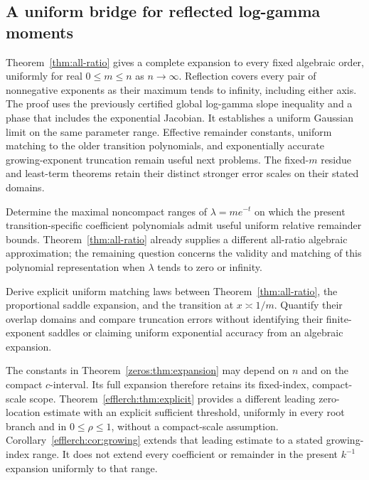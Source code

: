 \subsection{A uniform bridge for reflected log-gamma moments}
Theorem~\ref{thm:all-ratio} gives a complete expansion to every fixed
algebraic order, uniformly for real $0\le m\le n$ as $n\to\infty$.
Reflection covers every pair of nonnegative exponents as their maximum
tends to infinity, including either axis. The proof uses the previously
certified global log-gamma slope inequality and a phase that includes
the exponential Jacobian. It establishes a uniform Gaussian limit on
the same parameter range. Effective remainder constants, uniform
matching to the older transition polynomials, and exponentially accurate
growing-exponent truncation remain useful next problems. The fixed-$m$
residue and least-term theorems retain their distinct stronger error
scales on their stated domains.

\item Determine the maximal noncompact ranges of
$\lambda=me^{-t}$ on which the present transition-specific coefficient
polynomials admit useful uniform relative remainder bounds. Theorem~\ref{thm:all-ratio}
already supplies a different all-ratio algebraic approximation; the
remaining question concerns the validity and matching of this polynomial
representation when $\lambda$ tends to zero or infinity.

\item Derive explicit uniform matching laws between
Theorem~\ref{thm:all-ratio}, the proportional saddle expansion, and the
transition at $x\asymp1/m$. Quantify their overlap domains and compare
truncation errors without identifying their finite-exponent saddles or
claiming uniform exponential accuracy from an algebraic expansion.

\begin{remark}
The constants in Theorem~\ref{zeros:thm:expansion} may depend on $n$
and on the compact $c$-interval. Its full expansion therefore retains
its fixed-index, compact-scale scope. Theorem~\ref{efflerch:thm:explicit}
provides a different leading zero-location estimate with an explicit
sufficient threshold, uniformly in every root branch and in
$0\le\rho\le1$, without a compact-scale assumption.
Corollary~\ref{efflerch:cor:growing} extends that leading estimate to
a stated growing-index range. It does not extend every coefficient or
remainder in the present $k^{-1}$ expansion uniformly to that range.
\end{remark}

